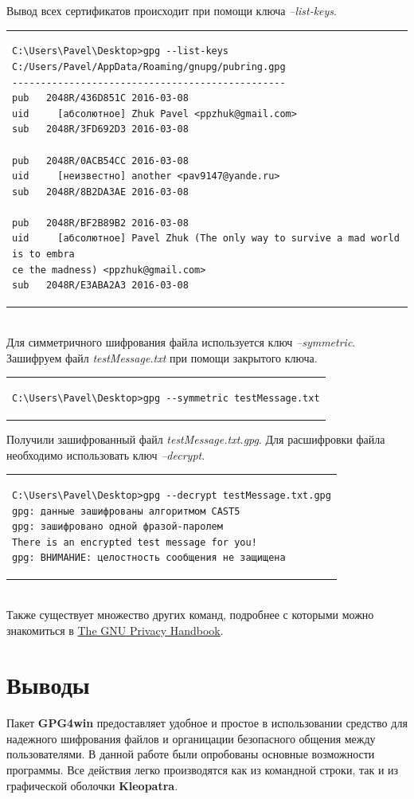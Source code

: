 \documentclass[10pt,a4paper,titlepage]{article}
\begin{document}
\newline
Вывод всех сертификатов происходит при помощи ключа  \textit{--list-keys}.\\
\newline
\begin{tabular}{|p{16cm}|}
\begin{verbatim}
C:\Users\Pavel\Desktop>gpg --list-keys
C:/Users/Pavel/AppData/Roaming/gnupg/pubring.gpg
------------------------------------------------
pub   2048R/436D851C 2016-03-08
uid     [абсолютное] Zhuk Pavel <ppzhuk@gmail.com>
sub   2048R/3FD692D3 2016-03-08

pub   2048R/0ACB54CC 2016-03-08
uid     [неизвестно] another <pav9147@yande.ru>
sub   2048R/8B2DA3AE 2016-03-08

pub   2048R/BF2B89B2 2016-03-08
uid     [абсолютное] Pavel Zhuk (The only way to survive a mad world is to embra
ce the madness) <ppzhuk@gmail.com>
sub   2048R/E3ABA2A3 2016-03-08
\end{verbatim}
\end{tabular}\\
\newline
Для симметричного шифрования файла используется ключ \textit{--symmetric}. Зашифруем файл \textit{testMessage.txt} при помощи закрытого ключа.\\
\newline
\begin{tabular}{|p{16cm}|}
\begin{verbatim}
C:\Users\Pavel\Desktop>gpg --symmetric testMessage.txt
\end{verbatim}
\end{tabular}
Получили зашифрованный файл \textit{testMessage.txt.gpg}. Для расшифровки файла необходимо использовать ключ \textit{--decrypt}.\\
\newline
\begin{tabular}{|p{16cm}|}
\begin{verbatim}
C:\Users\Pavel\Desktop>gpg --decrypt testMessage.txt.gpg
gpg: данные зашифрованы алгоритмом CAST5
gpg: зашифровано одной фразой-паролем
There is an encrypted test message for you!
gpg: ВНИМАНИЕ: целостность сообщения не защищена
\end{verbatim}
\end{tabular}\\
\newline
Также существует множество других команд, подробнее с которыми можно знакомиться в \href{https://www.gnupg.org/gph/en/manual.pdf}{The GNU Privacy Handbook}.
\section{Выводы}
Пакет \textbf{GPG4win} предоставляет удобное и простое в использовании средство для надежного шифрования файлов и органицации безопасного общения между пользователями. В данной работе были опробованы основные возможности программы. Все действия легко производятся как из командной строки, так и из графической оболочки \textbf{Kleopatra}.
\end{document}

